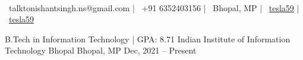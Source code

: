 \documentclass[]{awesome-cv}
\begin{document}
\begin{center}
      \\
    \vspace{2mm}
    {\faEnvelope\ talktonishantsingh.ns@gmail.com} | {\faMobile\ +91 6352403156} | {\faMapMarker\ Bhopal, MP} | {\faLinkedinSquare\ \href{https://www.linkedin.com/in/tesla59/}{tesla59}} | {\faGithubSquare\ \href{https://www.github.com/tesla59/}{tesla59}} \
\end{center}

\begin{cventries}
    \cventry
    {B.Tech in Information Technology | GPA: 8.71 }
    {Indian Institute of Information Technology Bhopal}
    {Bhopal, MP}
    {Dec, 2021 – Present}
    {}
\end{cventries}
\vspace{-6mm}
\end{document}

